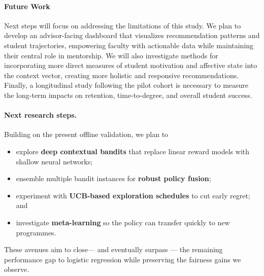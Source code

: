 \documentclass[conference]{IEEEtran}
\begin{document}
\paragraph*{Future Work}
Next steps will focus on addressing the limitations of this study. We plan to develop an advisor-facing dashboard that visualizes recommendation patterns and student trajectories, empowering faculty with actionable data while maintaining their central role in mentorship. We will also investigate methods for incorporating more direct measures of student motivation and affective state into the context vector, creating more holistic and responsive recommendations. Finally, a longitudinal study following the pilot cohort is necessary to measure the long-term impacts on retention, time-to-degree, and overall student success.
\paragraph{Next research steps.}
Building on the present offline validation, we plan to
\begin{itemize}[leftmargin=*]
  \item explore \textbf{deep contextual bandits} that replace linear reward models with shallow neural networks;
  \item ensemble multiple bandit instances for \textbf{robust policy fusion};
  \item experiment with \textbf{UCB-based exploration schedules} to cut early regret; and
  \item investigate \textbf{meta-learning} so the policy can transfer quickly to new programmes.
\end{itemize}
These avenues aim to close— and eventually surpass — the remaining performance gap to logistic regression while preserving the fairness gains we observe.



\end{document}
